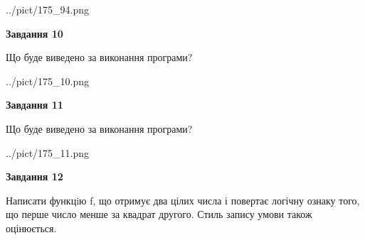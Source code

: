 \documentclass[12pt, ukrainian]{article}
\begin{document}
{\begin {large}
\begin{center}
	{../pict/175_94.png}
\end{center}
\newpage

{\begin {center}\textbf{Завдання 10}\end {center}}

Що буде виведено за виконання програми?\par
\begin{center}
	{../pict/175_10.png}
\end{center}
\newpage

{\begin {center}\textbf{Завдання 11}\end {center}}

Що буде виведено за виконання програми?\par
\begin{center}
	{../pict/175_11.png}
\end{center}
\newpage

{\begin {center}\textbf{Завдання 12}\end {center}}


Написати функцiю f, що отримує два цілих числа і повертає логічну ознаку того, що перше число менше за квадрат другого. Стиль запису умови також оцінюється.\par
\newpage

\end {large}}
\end{document}
